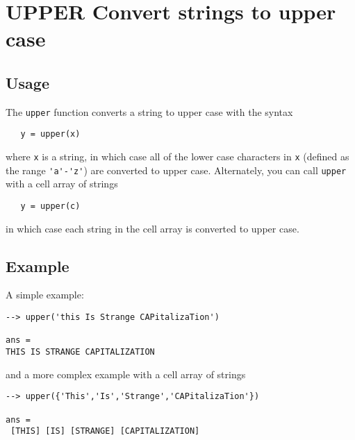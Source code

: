 \section{UPPER Convert strings to upper case}

\subsection{Usage}

The \verb|upper| function converts a string to upper case with
the syntax
\begin{verbatim}
   y = upper(x)
\end{verbatim}
where \verb|x| is a string, in which case all of the lower case
characters in \verb|x| (defined as the range \verb|'a'-'z'|) are
converted to upper case.  Alternately, you can call \verb|upper|
with a cell array of strings
\begin{verbatim}
   y = upper(c)
\end{verbatim}
in which case each string in the cell array is converted to upper case.
\subsection{Example}

A simple example:
\begin{verbatim}
--> upper('this Is Strange CAPitalizaTion')

ans = 
THIS IS STRANGE CAPITALIZATION
\end{verbatim}
and a more complex example with a cell array of strings
\begin{verbatim}
--> upper({'This','Is','Strange','CAPitalizaTion'})

ans = 
 [THIS] [IS] [STRANGE] [CAPITALIZATION] 
\end{verbatim}

